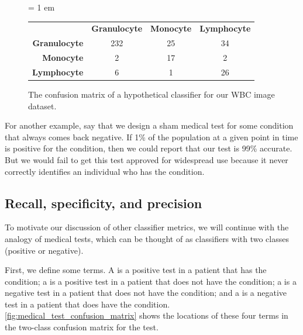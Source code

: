 \begin{figure}[h]
\centering
\tabcolsep = 1 em
\mySfFamily
{}
\begin{tabular}{r c c c}
\rowcolor{gray!50}
& \textbf{Granulocyte} & \textbf{Monocyte} & \textbf{Lymphocyte} \\
 \textbf{Granulocyte} & 232 & 25 & 34 \\
\textbf{Monocyte} & \phantom{55}2 & 17 & \phantom{5}2 \\
\textbf{Lymphocyte} & \phantom{55}6 & \phantom{5}1 & 26
\end{tabular}
\caption{The confusion matrix of a hypothetical classifier for our WBC image dataset.}
\label{fig:wbc_better_confusion_matrix}
\end{figure}

For another example, say that we design a sham medical test for some condition that always comes back negative. If 1\% of the population at a given point in time is positive for the condition, then we could report that our test is 99\% accurate. But we would fail to get this test approved for widespread use because it never correctly identifies an individual who has the condition.\\

\begin{qbox}\end{qbox}

\FloatBarrier
{}
\subsection{Recall, specificity, and precision}

To motivate our discussion of other classifier metrics, we will continue with the analogy of medical tests, which can be thought of as classifiers with two classes (positive or negative).

First, we define some terms. A  is a positive test in a patient that has the condition; a  is a positive test in a patient that does not have the condition; a  is a negative test in a patient that does not have the condition; and a  is a negative test in a patient that does have the condition. \autoref{fig:medical_test_confusion_matrix} shows the locations of these four terms in the two-class confusion matrix for the test.\\

